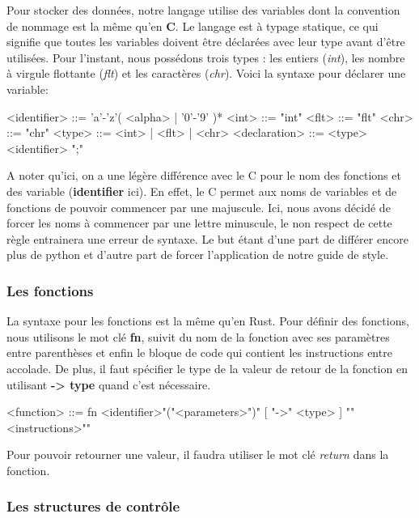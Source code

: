 \documentclass[a4paper]{article}%
\begin{document}
Pour stocker des données, notre langage utilise des variables dont la
convention de nommage est la même qu'en \textbf{C}. Le langage est à typage
statique, ce qui signifie que toutes les variables doivent être déclarées avec
leur type avant d'être utilisées. Pour l'instant, nous possédons trois types :
les entiers (\textit{int}), les nombre à virgule flottante (\textit{flt}) et les
caractères (\textit{chr}). Voici la syntaxe pour déclarer une variable:

\begin{grammar}
<identifier> ::= 'a'-'z'( <alpha> | '0'-'9' )*
<int> ::= "int"
<flt> ::= "flt"
<chr> ::= "chr"
<type> ::= <int> | <flt> | <chr>
<declaration> ::= <type> <identifier> ";"
\end{grammar}\leavevmode\newline

A noter qu'ici, on a une légère différence avec le C pour le nom des fonctions
et des variable (\textbf{identifier} ici). En effet, le C permet aux noms de
variables et de fonctions de pouvoir commencer par une majuscule. Ici, nous
avons décidé de forcer les noms à commencer par une lettre minuscule, le non
respect de cette règle entrainera une erreur de syntaxe. Le but étant d'une part
de différer encore plus de python et d'autre part de forcer l'application de
notre guide de style.

\subsubsection*{Les fonctions}

La syntaxe pour les fonctions est la même qu'en Rust. Pour définir des
fonctions, nous utilisons le mot clé \textbf{fn}, suivit du nom de la fonction
avec ses paramètres entre parenthèses et enfin le bloque de code qui contient
les instructions entre accolade. De plus, il faut spécifier le type de la valeur
de retour de la fonction en utilisant \textbf{-> type} quand c'est nécessaire.

\begin{grammar}
<function> ::= fn <identifier>"("<parameters>")" [ "->" <type> ] "{"<instructions>"}"
\end{grammar}\leavevmode\newline

Pour pouvoir retourner une valeur, il faudra utiliser le mot clé \textit{return}
dans la fonction.

\subsubsection*{Les structures de contrôle}
\end{document}
